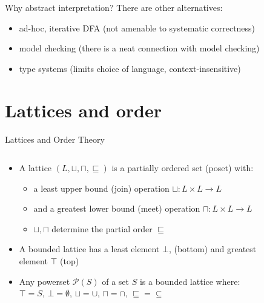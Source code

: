\documentclass[aspectratio=169,14pt]{beamer}
\begin{document}
\begin{frame}{Why abstract interpretation?}
There are other alternatives:
\begin{itemize}
\item ad-hoc, iterative DFA (not amenable to systematic correctness)
\item model checking (there is a neat connection with model checking)
\item type systems (limits choice of language, context-insensitive)
\end{itemize}
\end{frame}

\section{Lattices and order}
\begin{frame}{Lattices and Order Theory}
  \small
  \begin{columns}
  \begin{column}{0.5\textwidth}
  \begin{itemize}
  \item A lattice $(L, \sqcup, \sqcap, \sqsubseteq)$ is a partially ordered set (poset) with:
    \begin{itemize}
    \item a least upper bound (join) operation $\sqcup: L \times L \rightarrow L$
    \item and a greatest lower bound (meet) operation $\sqcap: L \times L \rightarrow L$
    \item $\sqcup, \sqcap$ determine the partial order $\sqsubseteq$
    \end{itemize}
  \item<9-> A bounded lattice has a least element $\bot$, (bottom)
    and greatest element $\top$ (top)
  \item<10-> Any powerset $\mathcal{P}(S)$ of a set $S$ is a bounded lattice where:
     $\top = S$,
     $\bot = \emptyset$,
     $\sqcup = \cup$,
     $\sqcap = \cap$,
     $\sqsubseteq = \subseteq$
  \end{itemize}
  \end{column}
  \begin{column}{0.5\textwidth}
    \vspace{-3cm}
  \begin{figure}[t]
    \centering
\end{figure}
\end{column}
\end{columns}
\end{frame}
\end{document}
